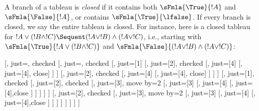 \documentclass[../../../include/open-logic-section]{subfiles}
\begin{document}
A branch of a tableau is \emph{closed} if it contains both
$\sFmla{\True}{!A}$ and $\sFmla{\False}{!A}$, or contains $\sFmla{\True}{\lfalse}$. If every branch is
closed, we say the entire tableau is closed. For instance, here is a
closed tableau for $!A \lor (!B \land !C) \Sequent (!A \lor !B) \land
(!A \lor !C)$, i.e., starting with $\sFmla{\True}{!A \lor (!B \land
!C)}$ and $\sFmla{\False}{(!A \lor !B) \land (!A \lor !C)}$:
\begin{maxwidth}
  \begin{tableau}{}
  [,
    just=\TAss, checked
    [, just=\TAss, checked
      [, just={\TRule{\True}{\lor}[1]}
        [,
          just={\TRule{\False}{\land}[2]}, checked
          [,
            just={\TRule{\False}{\lor}[4]}
            [,
              just={\TRule{\False}{\lor}[4]}, close]
          ]
        ]
        [,
          just={\TRule{\False}{\land}[2]}, checked
          [,
            just={\TRule{\False}{\lor}[4]}
            [,
              just={\TRule{\False}{\lor}[4]}, close]
          ]
        ]
      ]
      [,
        just={\TRule{\True}{\lor}[1]}, checked
        [,
          just={\TRule{\False}{\land}[2]}, checked
          [,
            just={\TRule{\True}{\land}[3]}, move by=2
            [,
              just={\TRule{\True}{\land}[3]}
              [,
                just={\TRule{\False}{\lor}[4]}
                [,
                  just={\TRule{\False}{\lor}[4]},close
                ]
              ]
            ]
          ]
        ]
        [,
          just={\TRule{\False}{\land}[2]}, checked
          [,
            just={\TRule{\True}{\land}[3]}, move by=2
              [,
                just={\TRule{\True}{\land}[3]}
                [,
                  just={\TRule{\False}{\lor}[4]}
                  [,
                  just={\TRule{\False}{\lor}[4]},close
                ]
              ]
            ]
          ]
        ]
      ]
    ]
  ]
\end{tableau}
\end{maxwidth}
\end{document}
